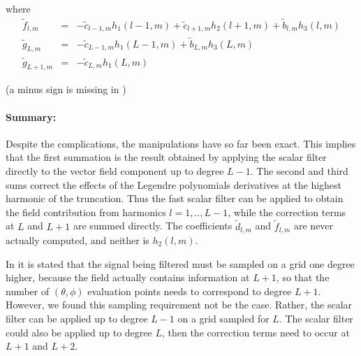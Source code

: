 where
\begin{eqnarray}
\widetilde f_{l,m} & = & -\widetilde c_{l-1,m}h_1(l-1,m) + \widetilde c_{l+1,m}h_2(l+1,m) + \widetilde b_{l,m}h_3(l,m)   \\
\widetilde g_{L,m} & = & -\widetilde c_{L-1,m}h_1(L-1,m) + \widetilde b_{L,m} h_3(L,m)  \label{correct3} \\
\widetilde g_{L+1,m} & = & -\widetilde c_{L,m}h_1(L,m) \label{correct4}
\end{eqnarray}


(a minus sign is missing in \cite{yucel2008helmholtz})

\paragraph{Summary:}

Despite the complications, the manipulations have so far been exact.  This implies that the first summation is the result obtained by applying the scalar filter directly to the vector field component up to degree $L-1$.  The second and third sums correct the effects of the Legendre polynomials derivatives at the highest harmonic of the truncation.  Thus the fast scalar filter can be applied to obtain the field contribution from harmonics $l = 1,..,L-1$, while the correction terms at $L$ and $L+1$ are summed directly.  The coefficients $\widetilde d_{l,m}$ and $\widetilde f_{l,m}$ are never actually computed, and neither is $h_2(l,m)$. 

In \cite{yucel2008helmholtz} it is stated that the signal being filtered must be sampled on a grid one degree higher, because the field actually contains information at $L+1$, so that the number of $(\theta,\phi)$ evaluation points needs to correspond to degree $L+1$.  However, we found this sampling requirement not be the case. Rather, the scalar filter can be applied up to degree $L-1$ on a grid sampled for $L$.  The scalar filter could also be applied up to degree $L$, then the correction terms need to occur at $L+1$ and $L+2$.  

